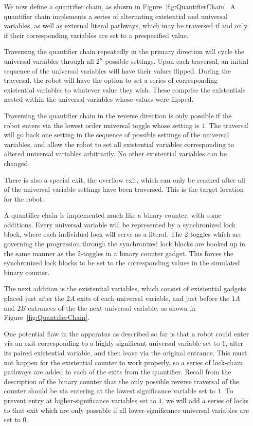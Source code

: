 We now define a quantifier chain, as shown in Figure~\ref{fig:QuantifierChain}. A quantifier chain implements a series of
alternating existential and universal variables, as well as external literal pathways, which may be traversed
if and only if their corresponding variables are set to a prespecified value.

Traversing the quantifier chain
repeatedly in the primary direction will cycle the universal variables through all $2^n$ possible settings.
Upon each traversal, an initial sequence of the universal variables will have their values flipped.
During the traversal, the robot will have the option to set a series of corresponding existential variables to whatever value they wish. These comprise the existentials nested within the universal variables whose values were flipped.

Traversing  the quantifier chain in the reverse direction is only possible if the robot enters
via the lowest order universal toggle whose setting is $1$. The traversal will go back one setting in the
sequence of possible settings of the universal variables, and allow the robot to set all existential variables
corresponding to altered universal variables arbitrarily. No other existential variables can be changed.

There is also a special exit, the overflow exit, which can only be
reached after all of the universal variable settings have been traversed. This is the target location for the robot.

A quantifier chain is implemented much like a binary counter, with some additions. Every universal variable will be represented by a synchronized lock block, where each individual lock will serve as a literal. The 2-toggles which are governing the progression through the synchronized lock blocks are hooked up in the same manner as the 2-toggles in a binary counter gadget. This forces the synchronized lock blocks to be set to the corresponding values in the simulated binary counter.

The next addition is the existential variables, which consist of existential gadgets placed just after the $2A$
exits of each universal variable,
and just before the $1A$ and $2B$ entrances of the the next universal variable, as shown
in Figure~\ref{fig:QuantifierChain}.

One potential flaw in the apparatus as described so far is that a robot could enter via an exit corresponding
to a highly significant universal variable set to $1$, alter its paired existential variable,
and then leave via the original entrance.
This must not happen for the existential counter to work properly, so a series of lock-chain pathways are added
to each of the exits from the quantifier. Recall from the description of the binary counter that the only
possible reverse traversal of the counter should be via entering at the lowest significance variable set to $1$.
To prevent
entry at higher-significance variables set to $1$, we will add a series of locks to
that exit which are only passable if
all lower-significance universal variables are set to $0$.

